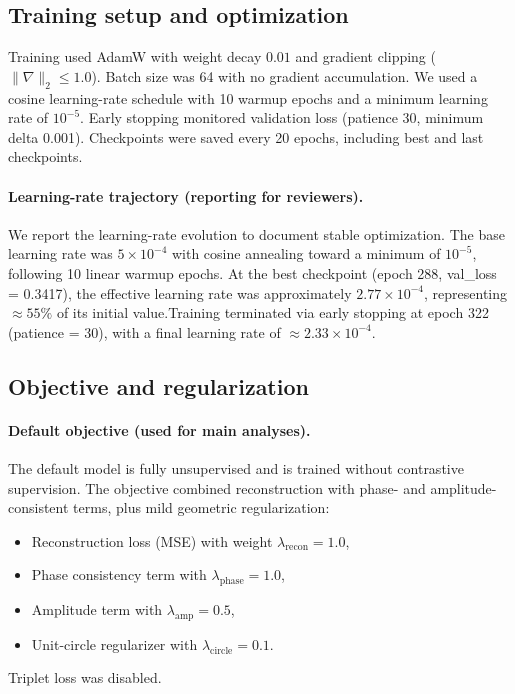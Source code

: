 \documentclass[5p,twocolumn,authoryear]{elsarticle}
\begin{document}
\subsection{Training setup and optimization}
\label{app:training}
Training used AdamW with weight decay $0.01$ and gradient clipping ($\|\nabla\|_2 \le 1.0$). Batch size was 64 with no gradient accumulation. We used a cosine learning-rate schedule with 10 warmup epochs and a minimum learning rate of $10^{-5}$. Early stopping monitored validation loss (patience 30, minimum delta 0.001). Checkpoints were saved every 20 epochs, including best and last checkpoints.

\paragraph{Learning-rate trajectory (reporting for reviewers).}
We report the learning-rate evolution to document stable optimization. The base learning rate was $5\times 10^{-4}$ with cosine annealing toward a minimum of $10^{-5}$, following 10 linear warmup epochs. At the best checkpoint (epoch 288, val\_loss = 0.3417), the effective learning rate was approximately $2.77\times 10^{-4}$, representing $\approx 55\%$ of its initial value.Training terminated via early stopping at epoch 322 (patience = 30), with a final learning rate of $\approx 2.33\times 10^{-4}$.

\subsection{Objective and regularization}
\label{app:loss}
\paragraph{Default objective (used for main analyses).}
The default model is fully unsupervised and is trained without contrastive supervision. The objective combined reconstruction with phase- and amplitude-consistent terms, plus mild geometric regularization:
\begin{itemize}
    \item Reconstruction loss (MSE) with weight $\lambda_{\mathrm{recon}}=1.0$,
    \item Phase consistency term with $\lambda_{\mathrm{phase}}=1.0$,
    \item Amplitude term with $\lambda_{\mathrm{amp}}=0.5$,
    \item Unit-circle regularizer with $\lambda_{\mathrm{circle}}=0.1$.
\end{itemize}
Triplet loss was disabled.
\end{document}
